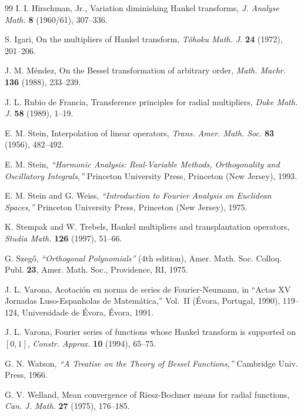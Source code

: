 \documentclass{amsart}
\theoremstyle{remark}
\begin{document}
\begin{thebibliography}{99}
 I. I. Hirschman, Jr.,
{Variation diminishing Hankel transforms},
\textit{J. Analyse Math.}
\textbf{8} (1960/61), 307--336.

 S. Igari,
{On the multipliers of Hankel transform},
\textit{T\^ohoku Math. J.}
\textbf{24} (1972), 201--206.

 J. M. M\'endez,
{On the Bessel transformation of arbitrary order},
\textit{Math. Machr.}
\textbf{136} (1988), 233--239.

 J. L. Rubio de Francia,
{Transference principles for radial multipliers},
\textit{Duke Math. J.}
\textbf{58} (1989), 1--19.

 E. M. Stein,
{Interpolation of linear operators},
\textit{Trans. Amer. Math. Soc.}
\textbf{83} (1956), 482--492.

 E. M. Stein,
\textit{``Harmonic Analysis: Real-Variable Methods, Orthogonality and
Oscillatory Integrals,''}
Princeton University Press, Princeton (New Jersey), 1993.

 E. M. Stein and G. Weiss,
\textit{``Introduction to Fourier Analysis on Euclidean Spaces,''}
Princeton University Press, Princeton (New Jersey), 1975.

 K. Stempak and W. Trebels,
{Hankel multipliers and transplantation operators},
\textit{Studia Math.}
\textbf{126} (1997), 51--66.

 G. Szeg\H{o},
\textit{``Orthogonal Polynomials''} (4th edition),
Amer. Math. Soc. Colloq. Publ.
\textbf{23}, Amer. Math. Soc.,
Providence, RI, 1975.

 J. L. Varona,
{Acotaci\'on en norma de series de Fourier-Neumann},
in ``Actas XV Jornadas Luso-Espanholas de Matem\'atica,'' Vol.~II
(\'Evora, Portugal, 1990), 119--124,
Universidade de \'Evora, \'Evora, 1991.

 J. L. Varona,
{Fourier series of functions whose Hankel transform is supported on
$[0,1]$},
\textit{Constr. Approx.}
\textbf{10} (1994), 65--75.

 G. N. Watson,
\textit{``A Treatise on the Theory of Bessel Functions,''}
Cambridge Univ. Press, 1966.

 G. V. Welland,
{Mean convergence of Riesz-Bochner means for radial functions},
\textit{Can. J. Math.}
\textbf{27} (1975), 176--185.

\end{thebibliography}
\end{document}
